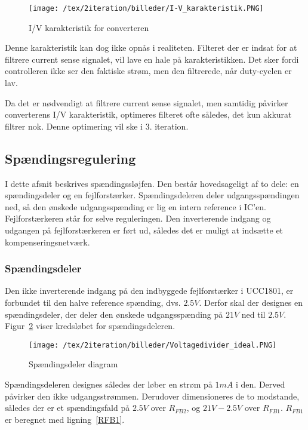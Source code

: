\begin{figure}[H]
	\center
	\texttt{[image: /tex/2iteration/billeder/I-V\_karakteristik.PNG]}
	\caption{I/V karakteristik for converteren}
	\label{fig:I-V_karateristik}
\end{figure}

Denne karakteristik kan dog ikke opnås i realiteten. Filteret der er indsat for at filtrere current sense signalet, vil lave en hale på karakteristikken. Det sker fordi controlleren ikke ser den faktiske strøm, men den filtrerede, når duty-cyclen er lav. 

Da det er nødvendigt at filtrere current sense signalet, men samtidig påvirker converterens I/V karakteristik, optimeres filteret ofte således, det kun akkurat filtrer nok. Denne optimering vil ske i 3. iteration. 

\subsection{Spændingsregulering} \label{V_loop}
I dette afsnit beskrives spændingssløjfen. Den består hovedsageligt af to dele: en spændingsdeler og en fejlforstærker. Spændingsdeleren deler udgangsspændingen ned, så den ønskede udgangsspænding er lig en intern reference i IC'en. Fejlforstærkeren står for selve reguleringen. Den inverterende indgang og udgangen på fejlforstærkeren er ført ud, således det er muligt at indsætte et kompenseringsnetværk.

\subsubsection{Spændingsdeler}
Den ikke inverterende indgang på den indbyggede fejlforstærker i UCC1801, er forbundet til den halve reference spænding, dvs. $2.5V$. Derfor skal der designes en spændingsdeler, der deler den ønskede udgangsspænding på $21V$ ned til $2.5V$. Figur~\ref{fig:Voltagedivider_ideal} viser kredsløbet for spændingsdeleren. 

\begin{figure}[H]
	\center
	\texttt{[image: /tex/2iteration/billeder/Voltagedivider\_ideal.PNG]}
	\caption{Spændingsdeler diagram}
	\label{fig:Voltagedivider_ideal}
\end{figure}

Spændingsdeleren designes således der løber en strøm på $1mA$ i den. Derved påvirker den ikke udgangsstrømmen. Derudover dimensioneres de to modstande, således der er et spændingsfald på $2.5V$ over $R_{FB2}$, og $21V-2.5V$ over $R_{FB1}$. $R_{FB1}$ er beregnet med ligning~\ref{RFB1}.

